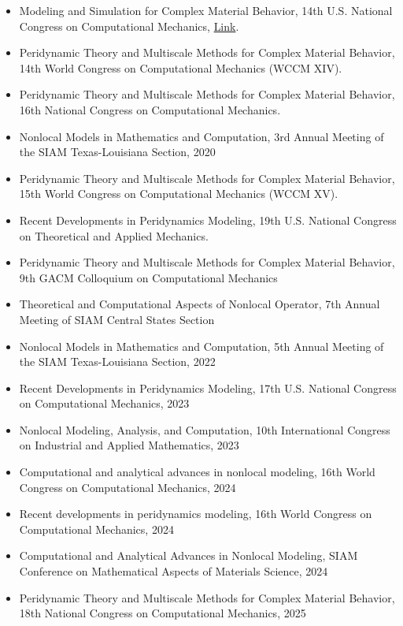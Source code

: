 \documentclass[11pt,a4paper,sans]{moderncv}
\begin{document}
\begin{itemize}[leftmargin=4cm]
\item Modeling and Simulation for Complex Material Behavior, 14th U.S. National Congress on Computational Mechanics, \href{http://14.usnccm.org/MS402}{Link}.
\item Peridynamic Theory and Multiscale Methods for Complex Material Behavior, 14th World Congress on Computational Mechanics (WCCM XIV).
\item Peridynamic Theory and Multiscale Methods for Complex Material Behavior, 16th National Congress on Computational Mechanics. 
\item Nonlocal Models in Mathematics and Computation, 3rd Annual Meeting of the SIAM Texas-Louisiana Section, 2020 
\item Peridynamic Theory and Multiscale Methods for Complex Material Behavior, 15th World Congress on Computational Mechanics (WCCM XV).
\item Recent Developments in Peridynamics Modeling, 19th U.S. National Congress on Theoretical and Applied Mechanics.
\item  Peridynamic Theory and Multiscale Methods for Complex Material Behavior,  9th GACM Colloquium on Computational Mechanics
\item Theoretical and Computational Aspects of Nonlocal Operator, 7th Annual Meeting of SIAM Central States Section
\item Nonlocal Models in Mathematics and Computation, 5th Annual Meeting of the SIAM Texas-Louisiana Section, 2022
\item  Recent Developments in Peridynamics Modeling, 17th U.S. National Congress on Computational Mechanics, 2023
\item Nonlocal Modeling, Analysis, and Computation, 10th International Congress on Industrial and Applied Mathematics, 2023
\item Computational and analytical advances in nonlocal modeling, 16th World Congress on Computational Mechanics, 2024
\item Recent developments in peridynamics modeling, 16th World Congress on Computational Mechanics, 2024
\item Computational and Analytical Advances in Nonlocal Modeling, SIAM Conference on Mathematical Aspects of Materials Science, 2024 
\item Peridynamic Theory and Multiscale Methods for Complex Material Behavior, 18th National Congress on Computational Mechanics, 2025
\end{itemize}
\end{document}
